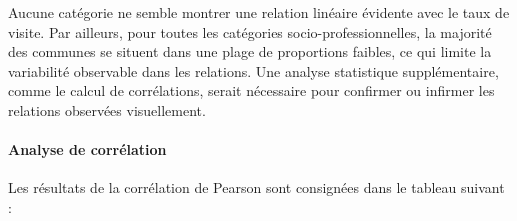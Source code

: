 \documentclass[
]{article}
\begin{document}
Aucune catégorie ne semble montrer une relation linéaire évidente avec
le taux de visite. Par ailleurs, pour toutes les catégories
socio-professionnelles, la majorité des communes se situent dans une
plage de proportions faibles, ce qui limite la variabilité observable
dans les relations. Une analyse statistique supplémentaire, comme le
calcul de corrélations, serait nécessaire pour confirmer ou infirmer les
relations observées visuellement.

\hypertarget{analyse-de-corruxe9lation}{%
\paragraph{Analyse de corrélation}\label{analyse-de-corruxe9lation}}

Les résultats de la corrélation de Pearson sont consignées dans le
tableau suivant :
\end{document}
